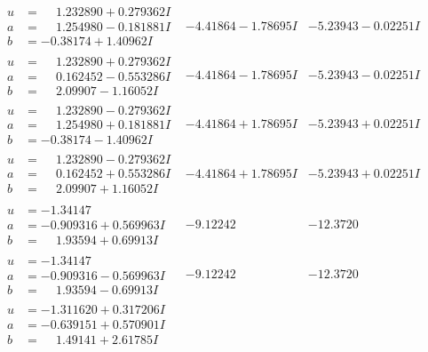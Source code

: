 \documentclass[1p]{elsarticle_modified}
\theoremstyle{definition}
\begin{document}
$$\begin{array}{c|c|c}
\begin{aligned}
u &= \phantom{-}1.232890 + 0.279362 I \\
a &= \phantom{-}1.254980 - 0.181881 I \\
b &= -0.38174 + 1.40962 I\end{aligned}
 & -4.41864 - 1.78695 I & -5.23943 - 0.02251 I \\ \hline\begin{aligned}
u &= \phantom{-}1.232890 + 0.279362 I \\
a &= \phantom{-}0.162452 - 0.553286 I \\
b &= \phantom{-}2.09907 - 1.16052 I\end{aligned}
 & -4.41864 - 1.78695 I & -5.23943 - 0.02251 I \\ \hline\begin{aligned}
u &= \phantom{-}1.232890 - 0.279362 I \\
a &= \phantom{-}1.254980 + 0.181881 I \\
b &= -0.38174 - 1.40962 I\end{aligned}
 & -4.41864 + 1.78695 I & -5.23943 + 0.02251 I \\ \hline\begin{aligned}
u &= \phantom{-}1.232890 - 0.279362 I \\
a &= \phantom{-}0.162452 + 0.553286 I \\
b &= \phantom{-}2.09907 + 1.16052 I\end{aligned}
 & -4.41864 + 1.78695 I & -5.23943 + 0.02251 I \\ \hline\begin{aligned}
u &= -1.34147\phantom{ +0.000000I} \\
a &= -0.909316 + 0.569963 I \\
b &= \phantom{-}1.93594 + 0.69913 I\end{aligned}
 & -9.12242\phantom{ +0.000000I} & -12.3720\phantom{ +0.000000I} \\ \hline\begin{aligned}
u &= -1.34147\phantom{ +0.000000I} \\
a &= -0.909316 - 0.569963 I \\
b &= \phantom{-}1.93594 - 0.69913 I\end{aligned}
 & -9.12242\phantom{ +0.000000I} & -12.3720\phantom{ +0.000000I} \\ \hline\begin{aligned}
u &= -1.311620 + 0.317206 I \\
a &= -0.639151 + 0.570901 I \\
b &= \phantom{-}1.49141 + 2.61785 I\end{aligned}

\end{array}$$
\end{document}
